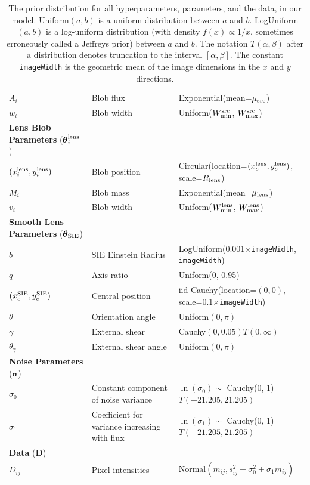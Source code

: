 \documentclass[useAMS,usenatbib]{mn2e}
\begin{document}
\begin{table}
\begin{tabular}{|l|l|l|}
$A_i$  & Blob flux & Exponential(mean=$\mu_{\rm src}$)\\
$w_i$  & Blob width & Uniform($W_{\rm min}^{\rm src}$, $W_{\rm max}^{\rm src}$)\\
\hline
{\bf Lens Blob Parameters} ($\boldsymbol{\theta}_i^{\rm lens}$)\\
\hline
$(x_i^{\rm lens}, y_i^{\rm lens})$ & Blob position & Circular(location=$(x_c^{\rm lens}, y_c^{\rm lens})$, scale=$R_{\rm lens}$) \\
$M_i$  & Blob mass & Exponential(mean=$\mu_{\rm lens}$)\\
$v_i$  & Blob width & Uniform($W_{\rm min}^{\rm lens}$, $W_{\rm max}^{\rm lens}$)\\
\hline
{\bf Smooth Lens Parameters} ($\boldsymbol{\theta}_{\rm SIE}$)\\
\hline
$b$ & SIE Einstein Radius & LogUniform(0.001$\times${\tt imageWidth}, {\tt imageWidth})\\
$q$ & Axis ratio & Uniform(0, 0.95)\\
$(x_c^{\rm SIE}, y_c^{\rm SIE})$ & Central position & iid Cauchy(location=$(0,0)$, scale=0.1$\times${\tt imageWidth})\\
$\theta$ & Orientation angle & Uniform$(0, \pi)$\\
$\gamma$ & External shear & Cauchy$(0, 0.05)T(0, \infty)$\\
$\theta_\gamma$ & External shear angle & Uniform$(0, \pi)$\\
\hline
{\bf Noise Parameters} ($\boldsymbol{\sigma}$)\\
\hline
$\sigma_0$ & Constant component of noise variance & $\ln(\sigma_0) \sim$ Cauchy(0, 1)$T(-21.205, 21.205)$\\
$\sigma_1$ & Coefficient for variance increasing with flux &
$\ln(\sigma_1) \sim$ Cauchy(0, 1)$T(-21.205, 21.205)$\\
\hline
{\bf Data} ($\boldsymbol{D}$)\\
\hline
$D_{ij}$ & Pixel intensities & Normal$(m_{ij}, s_{ij}^2 + \sigma_0^2 + \sigma_1m_{ij})$
\end{tabular}
\caption{The prior distribution for all hyperparameters, parameters, and the
data, in our model. Uniform$(a, b)$ is a uniform
distribution between $a$ and $b$. LogUniform$(a, b)$ is a log-uniform
distribution (with density $f(x) \propto 1/x$, sometimes erroneously called
a Jeffreys prior) between $a$ and $b$. The notation $T(\alpha, \beta)$ after
a distribution denotes truncation to the interval $[\alpha, \beta]$. The
constant {\tt imageWidth} is the geometric mean of the image dimensions in
the $x$ and $y$ directions.
\label{tab:priors}}
\end{table}
\end{document}
